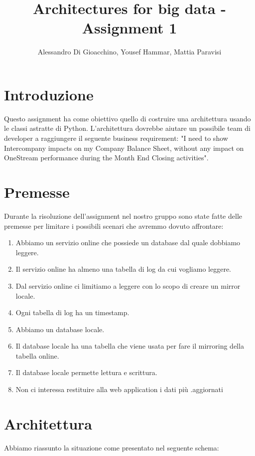 \documentclass[a4paper]{article}
\title{Architectures for big data - Assignment 1}
\author{Alessandro Di Gioacchino, Yousef Hammar, Mattia Paravisi}
\begin{document}
\maketitle
\newpage

\section{Introduzione}
Questo assignment ha come obiettivo quello di costruire una architettura usando le classi astratte di Python. L'architettura dovrebbe
aiutare un possibile team di developer a raggiungere il seguente business requirement: "I need to show Intercompany impacts on my Company Balance Sheet, without any impact on OneStream
performance during the Month End Closing activities".

\section{Premesse}
Durante la risoluzione dell'assignment nel nostro gruppo sono state fatte delle premesse per limitare i possibili scenari che avremmo dovuto affrontare:
\begin{enumerate}
    \item Abbiamo un servizio online che possiede un database dal quale dobbiamo leggere.
    \item Il servizio online ha almeno una tabella di log da cui vogliamo leggere.
    \item Dal servizio online ci limitiamo a leggere con lo scopo di creare un mirror locale.
    \item Ogni tabella di log ha un timestamp.
    \item Abbiamo un database locale.
    \item Il database locale ha una tabella che viene usata per fare il mirroring della tabella online.
    \item Il database locale permette lettura e scrittura.
    \item Non ci interessa restituire alla web application i dati più
    .aggiornati
\end{enumerate}

\section{Architettura}
Abbiamo riassunto la situazione come presentato nel seguente schema:
\end{document}
